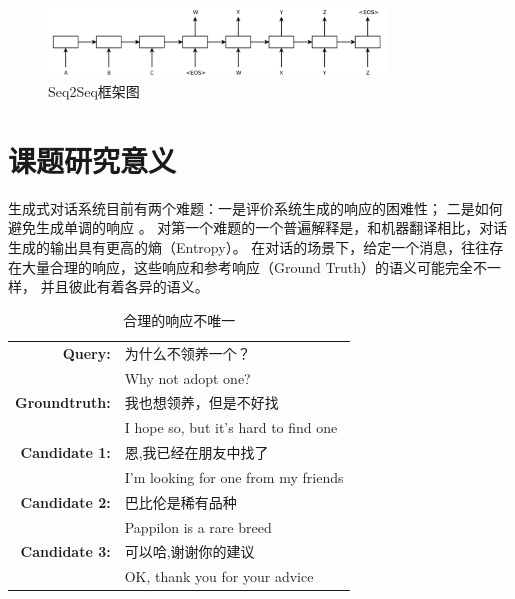 \begin{figure}[H]
    \centering
    \includegraphics[width=0.8\textwidth]{figure/Seq2Seq.png}
    \caption{Seq2Seq框架图}
    \label{fig:Seq2Seq}
\end{figure}

\section{课题研究意义}\label{sec:research_meaning}
生成式对话系统目前有两个难题：一是评价系统生成的响应的困难性；
二是如何避免生成单调的响应
。
对第一个难题的一个普遍解释是，和机器翻译相比，对话生成的输出具有更高的熵（Entropy）。
在对话的场景下，给定一个消息，往往存在大量合理的响应，这些响应和参考响应（Ground Truth）的语义可能完全不一样，
并且彼此有着各异的语义。

\begin{table}[H]
    \centering
    \caption{合理的响应不唯一}
    \label{tab:multiple_valid_responses}
    \begin{tabular}{rl}
        \toprule
        \textbf{Query:} & 为什么不领养一个？ \\
        & Why not adopt one? \\
        \textbf{Groundtruth:} & 我也想领养，但是不好找 \\
        & I hope so, but it's hard to find one \\
        \midrule
        \textbf{Candidate 1:} & 恩,我已经在朋友中找了 \\
        & I'm looking for one from my friends \\
        \textbf{Candidate 2:} & 巴比伦是稀有品种 \\
        & Pappilon is a rare breed \\
        \textbf{Candidate 3:} & 可以哈,谢谢你的建议 \\
        & OK, thank you for your advice \\
        \bottomrule
    \end{tabular}
\end{table}

